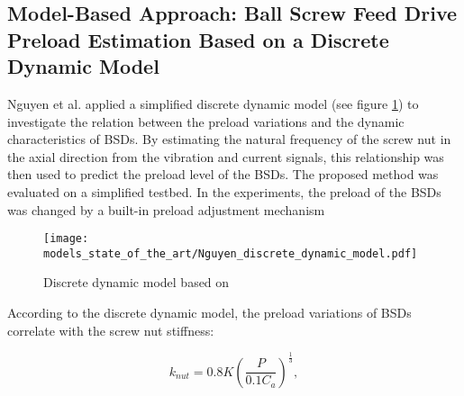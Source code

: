 \subsection{Model-Based Approach: Ball Screw Feed Drive Preload Estimation Based on a Discrete Dynamic Model}
Nguyen et al. \cite{NGUYEN2019} applied a simplified discrete dynamic model (see figure \ref{fig:Nguyen_discrete_dynamic_model}) to investigate the relation between the preload variations and the dynamic characteristics of BSDs. By estimating the natural frequency of the screw nut in the axial direction from the vibration and current signals, this relationship was then used to predict the preload level of the BSDs. The proposed method was evaluated on a simplified testbed. In the experiments, the preload of the BSDs was changed by a built-in preload adjustment mechanism

\begin{figure}[H]
  \centering
  \texttt{[image: models\_state\_of\_the\_art/Nguyen\_discrete\_dynamic\_model.pdf]}
  \caption{Discrete dynamic model based on \cite{NGUYEN2019}}
  \label{fig:Nguyen_discrete_dynamic_model}
\end{figure}

According to the discrete dynamic model, the preload variations of BSDs correlate with the screw nut stiffness:

\begin{equation}
    k_{nut}=0.8K(\frac{P}{0.1C_{a}})^{\frac{1}{3}},
\end{equation}

